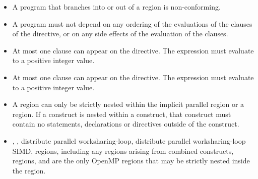 \begin{itemize}
\item A program that branches into or out of a  region is non-conforming.

\item A program must not depend on any ordering of the evaluations of the clauses of the
 directive, or on any side effects of the evaluation of the clauses.

\item At most one  clause can appear on the directive. The
 expression must evaluate to a positive integer value.

\item At most one  clause can appear on the directive. The 
expression must evaluate to a positive integer value.

\item A  region can only be strictly nested within the implicit parallel region or a  region.
If a  construct is nested within a  construct,
that  construct must contain no statements, declarations or
directives outside of the  construct.

\item {}, , distribute parallel worksharing-loop,
distribute parallel worksharing-loop SIMD,  regions, including any
 regions arising from combined constructs,  regions, and  are the only OpenMP regions
that may be strictly nested inside the  region.

\end{itemize}

